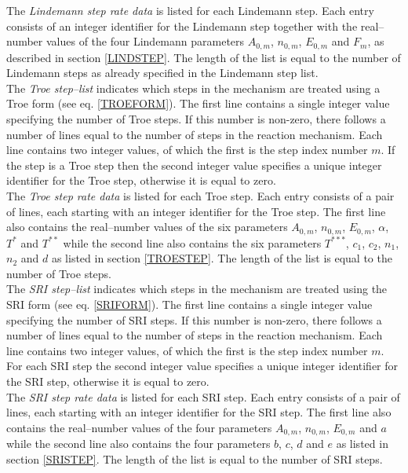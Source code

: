 \documentclass[dvips]{article}
\begin{document}
\noindent
The {\it Lindemann step rate data} is listed for each Lindemann step.
Each entry consists of an integer identifier for the Lindemann step
together with the real--number values of the four Lindemann parameters
$A_{0,m}$, $n_{0,m}$, $E_{0,m}$ and $F_{m}$, as described in section
\ref{LINDSTEP}.
The length of the list is equal to the number of Lindemann steps as
already specified in the Lindemann step list.\\

\noindent
The {\it Troe step--list} indicates which steps in the mechanism are treated
using a Troe form (see eq. \ref{TROEFORM}).  The first line contains a single
integer
value specifying the number of Troe steps.  If this number is non-zero, there
follows a number of lines equal to the number of steps in the reaction
mechanism.  Each line contains two integer values, of which the first is
the step index number $m$.  If the step is a Troe step then the second
integer value specifies a unique integer identifier for the Troe step,
otherwise it is equal to zero.\\

\noindent
The {\it Troe step rate data} is listed for each Troe step.
Each entry consists of a pair of lines, each starting with an integer
identifier for the Troe step.  The first line also contains the real--number
values of the six parameters $A_{0,m}$, $n_{0,m}$, $E_{0,m}$, $\alpha$,
$T^{*}$ and $T^{**}$ while the second line also contains the six
parameters $T^{***}$, $c_{1}$, $c_{2}$, $n_{1}$, $n_{2}$ and $d$
as listed in section \ref{TROESTEP}.
The length of the list is equal to the number of Troe steps.\\

\noindent
The {\it SRI step--list} indicates which steps in the mechanism are treated
using the SRI form (see eq. \ref{SRIFORM}).  The first line contains a single
integer
value specifying the number of SRI steps.  If this number is non-zero, there
follows a number of lines equal to the number of steps in the reaction
mechanism.  Each line contains two integer values, of which the first is
the step index number $m$.  For each SRI step the second
integer value specifies a unique integer identifier for the SRI step,
otherwise it is equal to zero.\\

\noindent
The {\it SRI step rate data} is listed for each SRI step.
Each entry consists of a pair of lines, each starting with an integer
identifier for the SRI step.  The first line also contains the real--number
values of the four parameters $A_{0,m}$, $n_{0,m}$, $E_{0,m}$ and $a$ while
the second line also contains the four parameters $b$, $c$, $d$ and $e$ as
listed in section \ref{SRISTEP}.
The length of the list is equal to the number of SRI steps.\\
\end{document}
